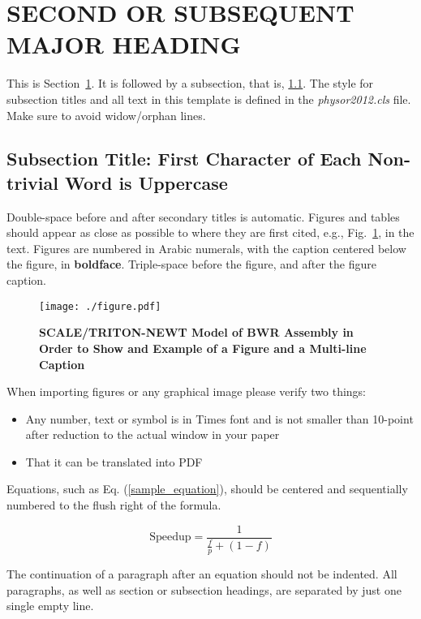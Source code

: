 \documentclass{physor2012}
\begin{document}
\section{SECOND OR SUBSEQUENT MAJOR HEADING} 
\label{sec:first}
%
This is Section~\ref{sec:first}. It is followed by a subsection, that is, 
\ref{sec:second}. The style for subsection titles and all text in this template is defined in 
the \emph{physor2012.cls} file.  Make sure to avoid widow/orphan lines.
%
\subsection{Subsection Title: First Character of Each Non-trivial Word is Uppercase} 
\label{sec:second}
%
Double-space before and after secondary titles is automatic.  Figures and 
tables should appear as close as possible to where they are first
cited, e.g., Fig.~\ref{fig:amdahl}, in the text.  Figures are numbered in Arabic 
numerals, with the caption centered below the figure, in \textbf{boldface}.  
Triple-space before the figure, and after the figure caption.

\begin{figure}[!htb]
  \centering
  \texttt{[image: ./figure.pdf]}
  \caption{\bf SCALE/TRITON-NEWT Model of BWR Assembly in Order to Show and Example of a Figure and a Multi-line Caption} 
  \label{fig:amdahl}
\end{figure}

When importing figures or any graphical image please verify two things:
\begin{itemize}
\item Any number, text or symbol is in Times font and is not smaller than 
  10-point after reduction to the actual window in your paper
\item That it can be translated into PDF
\end{itemize}
Equations, such as Eq. (\ref{sample_equation}), should be centered and 
sequentially numbered to the flush right of the formula.

\begin{equation}
  \label{sample_equation}
  \mathrm{Speedup}=\frac{1}{\frac{f}{p}+(1-f)}
\end{equation}

The continuation of a paragraph after an equation should not be indented.  
All paragraphs, as well as section or subsection headings, are separated by 
just one single empty line.
%
\end{document}
